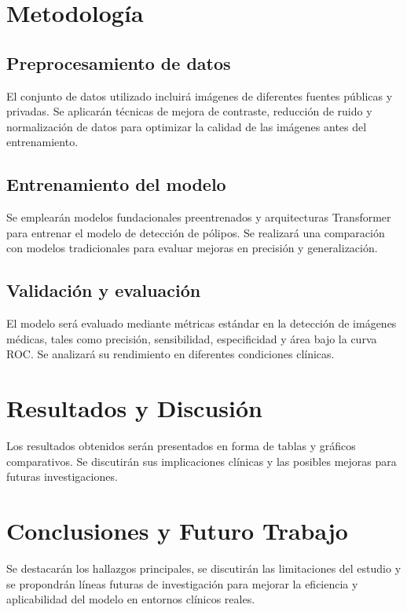 \documentclass[a4paper,12pt]{report}
\begin{document}
\chapter{Metodología}
\section{Preprocesamiento de datos}
El conjunto de datos utilizado incluirá imágenes de diferentes fuentes públicas y privadas. Se aplicarán técnicas de mejora de contraste, reducción de ruido y normalización de datos para optimizar la calidad de las imágenes antes del entrenamiento.

\section{Entrenamiento del modelo}
Se emplearán modelos fundacionales preentrenados y arquitecturas Transformer para entrenar el modelo de detección de pólipos. Se realizará una comparación con modelos tradicionales para evaluar mejoras en precisión y generalización.

\section{Validación y evaluación}
El modelo será evaluado mediante métricas estándar en la detección de imágenes médicas, tales como precisión, sensibilidad, especificidad y área bajo la curva ROC. Se analizará su rendimiento en diferentes condiciones clínicas.

\chapter{Resultados y Discusión}
Los resultados obtenidos serán presentados en forma de tablas y gráficos comparativos. Se discutirán sus implicaciones clínicas y las posibles mejoras para futuras investigaciones.

\chapter{Conclusiones y Futuro Trabajo}
Se destacarán los hallazgos principales, se discutirán las limitaciones del estudio y se propondrán líneas futuras de investigación para mejorar la eficiencia y aplicabilidad del modelo en entornos clínicos reales.



\end{document}
